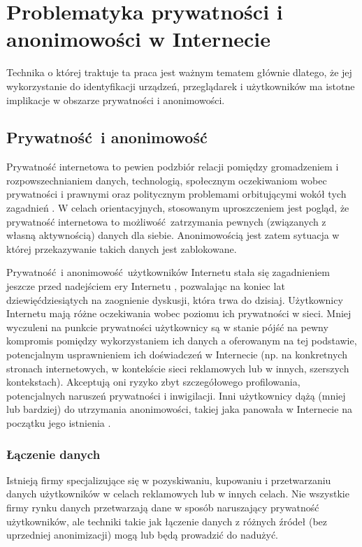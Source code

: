 \chapter{Problematyka prywatności i anonimowości w Internecie}
Technika o której traktuje ta praca jest ważnym tematem głównie dlatego, że jej
wykorzystanie do identyfikacji urządzeń, przeglądarek i użytkowników ma istotne
implikacje w obszarze prywatności i anonimowości.

\section{Prywatność i anonimowość}
Prywatność internetowa to pewien podzbiór relacji pomiędzy gromadzeniem i
rozpowszechnianiem danych, technologią, społecznym oczekiwaniom wobec
prywatności i prawnymi oraz politycznym problemami orbitującymi wokół tych
zagadnień \cite{michael2014uberveillance}. W celach orientacyjnych, stosowanym
uproszczeniem jest pogląd, że prywatność internetowa to możliwość zatrzymania
pewnych (związanych z własną aktywnością) danych dla siebie. Anonimowością jest
zatem sytuacja w której przekazywanie takich danych jest zablokowane.

Prywatność i anonimowość użytkowników Internetu stała się zagadnieniem jeszcze
przed nadejściem ery Internetu \cite{david1965some}, pozwalając na koniec lat
dziewięćdziesiątych na zaognienie dyskusji, która trwa do dzisiaj. Użytkownicy
Internetu mają różne oczekiwania wobec poziomu ich prywatności w sieci. Mniej
wyczuleni na punkcie prywatności użytkownicy są w stanie pójść na pewny
kompromis pomiędzy wykorzystaniem ich danych a oferowanym na tej podstawie,
potencjalnym usprawnieniem ich doświadczeń w Internecie (np. na konkretnych
stronach internetowych, w kontekście sieci reklamowych lub w innych, szerszych
kontekstach). Akceptują oni ryzyko zbyt szczegółowego profilowania,
potencjalnych naruszeń prywatności i inwigilacji. Inni użytkownicy dążą (mniej
lub bardziej) do utrzymania anonimowości, takiej jaka panowała w Internecie na
początku jego istnienia \cite[s. 54--69]{snowden2019pamiec}.

\subsection{Łączenie danych}
Istnieją firmy specjalizujące się w pozyskiwaniu, kupowaniu i przetwarzaniu
danych użytkowników w celach reklamowych lub w innych celach. Nie wszystkie
firmy rynku danych przetwarzają dane w sposób naruszający prywatność
użytkowników, ale techniki takie jak łączenie danych z różnych źródeł (bez
uprzedniej anonimizacji) mogą lub będą prowadzić do nadużyć.

